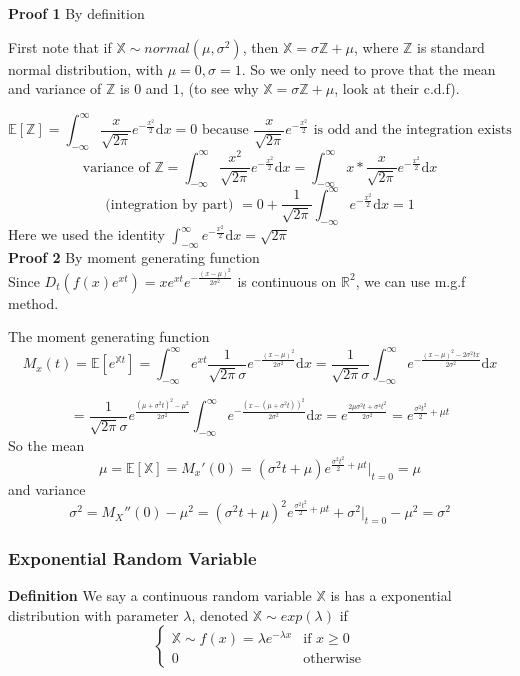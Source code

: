 \documentclass[a4paper,12pt]{article}
\begin{document}
\textbf{Proof 1} By definition

First note that if $\mathbb{X} \sim normal(\mu, \sigma^2)$, then $\mathbb{X} = \sigma\mathbb{Z}+\mu$, where $\mathbb{Z}$ is standard normal distribution, with $\mu = 0, \sigma = 1$. So we only need to prove that the mean and variance of $\mathbb{Z}$ is $0$ and $1$, (to see why $\mathbb{X} = \sigma\mathbb{Z}+\mu$, look at their c.d.f).

$$\mathbb{E}[\mathbb{Z}] = \int_{-\infty}^\infty \frac{x}{\sqrt{2\pi}} e^{-\frac{x^2}{2}}\mathrm{d}x = 0 \text{ because } \frac{x}{\sqrt{2\pi}} e^{-\frac{x^2}{2}} \text{ is odd and the integration exists}$$
$$\text{variance of } \mathbb{Z} = \int_{-\infty}^\infty \frac{x^2}{\sqrt{2\pi}} e^{-\frac{x^2}{2}}\mathrm{d}x = \int_{-\infty}^\infty x * \frac{x}{\sqrt{2\pi}} e^{-\frac{x^2}{2}}\mathrm{d}x$$
$$\text{(integration by part) } = 0 + \frac{1}{\sqrt{2\pi}} \int_{-\infty}^\infty e^{-\frac{x^2}{2}}\mathrm{d}x = 1$$
Here we used the identity $\int_{-\infty}^\infty e^{-\frac{x^2}{2}}\mathrm{d}x = \sqrt{2\pi}$\\

\textbf{Proof 2} By moment generating function\\

Since $D_t (f(x)e^{xt}) = xe^{xt}e^{-\frac{(x-\mu)^2}{2\sigma^2}}$ is continuous on $\mathbb{R}^2$, we can use m.g.f method.

The moment generating function
$$M_x(t) = \mathbb{E}[e^{\mathbb{X}t}] = \int_{-\infty}^\infty e^{xt} \frac{1}{\sqrt{2\pi}\sigma}e^{-\frac{(x-\mu)^2}{2\sigma^2}} \mathrm{d}x = \frac{1}{\sqrt{2\pi}\sigma} \int_{-\infty}^\infty e^{-\frac{(x-\mu)^2-2 \sigma^2 t x}{2\sigma^2}} \mathrm{d}x$$

$$= \frac{1}{\sqrt{2\pi}\sigma} e^{\frac{(\mu+\sigma^2 t)^2 - \mu^2}{2\sigma^2}} \int_{-\infty}^\infty e^{-\frac{(x-(\mu+\sigma^2 t))^2}{2\sigma^2}} \mathrm{d}x = e^{\frac{2\mu\sigma^2 t+\sigma^4 t^2 }{2\sigma^2}} = e^{\frac{\sigma^2 t^2}{2}+\mu t}$$
So the mean
$$ \mu = \mathbb{E}[\mathbb{X}] = M_x'(0) = (\sigma^2 t + \mu) e^{\frac{\sigma^2 t^2}{2}+\mu t} |_{t=0} = \mu$$
and variance
$$\sigma^2 = M_X''(0) - \mu^2 = (\sigma^2 t + \mu)^2 e^{\frac{\sigma^2 t^2}{2}+\mu t} + \sigma^2 |_{t=0} - \mu^2 = \sigma^2$$


\subsubsection{Exponential Random Variable}
\textbf{Definition} We say a continuous random variable $\mathbb{X}$ is has a exponential distribution with parameter $\lambda$, denoted $\mathbb{X} \sim exp(\lambda)$ if
$$
\begin{cases}
 \mathbb{X} \sim f(x) = \lambda e^{-\lambda x} & \text{if } x \geq 0\\
 0 & \text{otherwise}
 \end{cases}
$$
\end{document}
